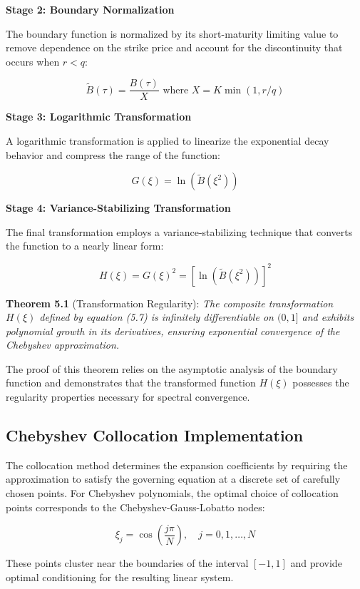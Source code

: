 \documentclass[
  american,
  11pt,
  11pt,
  letterpaper,
  onecolumn]{article}
\begin{document}
\textbf{Stage 2: Boundary Normalization}

The boundary function is normalized by its short-maturity limiting value
to remove dependence on the strike price and account for the
discontinuity that occurs when \(r < q\):

\[\widetilde{B}(\tau) = \frac{B(\tau)}{X} \text{ where } X = K \min(1, r/q) \tag{5.5}\]

\textbf{Stage 3: Logarithmic Transformation}

A logarithmic transformation is applied to linearize the exponential
decay behavior and compress the range of the function:

\[G(\xi) = \ln(\widetilde{B}(\xi^2)) \tag{5.6}\]

\textbf{Stage 4: Variance-Stabilizing Transformation}

The final transformation employs a variance-stabilizing technique that
converts the function to a nearly linear form:

\[H(\xi) = G(\xi)^2 = [\ln(\widetilde{B}(\xi^2))]^2 \tag{5.7}\]

\textbf{Theorem 5.1} (Transformation Regularity): \emph{The composite
transformation \(H(\xi)\) defined by equation (5.7) is infinitely
differentiable on \((0,1]\) and exhibits polynomial growth in its
derivatives, ensuring exponential convergence of the Chebyshev
approximation.}

The proof of this theorem relies on the asymptotic analysis of the
boundary function and demonstrates that the transformed function
\(H(\xi)\) possesses the regularity properties necessary for spectral
convergence.

\subsection{Chebyshev Collocation
Implementation}\label{chebyshev-collocation-implementation}

The collocation method determines the expansion coefficients by
requiring the approximation to satisfy the governing equation at a
discrete set of carefully chosen points. For Chebyshev polynomials, the
optimal choice of collocation points corresponds to the
Chebyshev-Gauss-Lobatto nodes:

\[\xi_j = \cos\left(\frac{j\pi}{N}\right), \quad j = 0, 1, \ldots, N \tag{5.8}\]

These points cluster near the boundaries of the interval \([-1,1]\) and
provide optimal conditioning for the resulting linear system.
\end{document}
